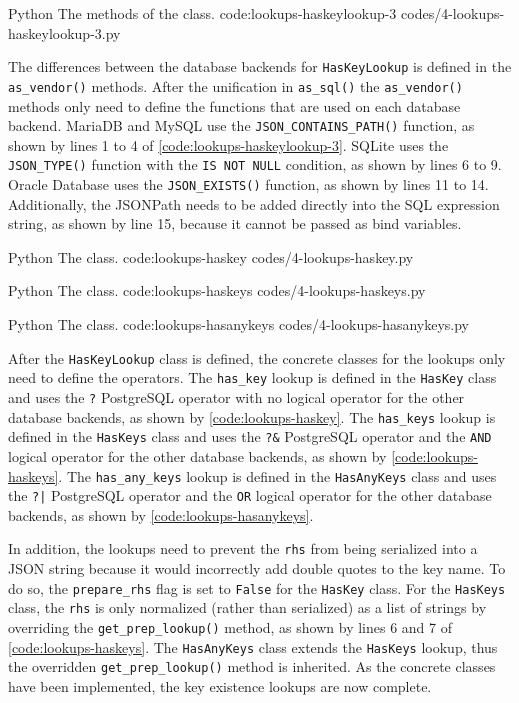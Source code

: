 \listing
{Python}
{The  methods of the  class.}
{code:lookups-haskeylookup-3}
{codes/4-lookups-haskeylookup-3.py}

The differences between the database backends for \verb|HasKeyLookup| is
defined in the \verb|as_vendor()| methods. After the unification in
\verb|as_sql()| the \verb|as_vendor()| methods only need to define the
functions that are used on each database backend. MariaDB and MySQL use the
\verb|JSON_CONTAINS_PATH()| function, as shown by lines 1 to 4 of
\autoref{code:lookups-haskeylookup-3}. SQLite uses the \verb|JSON_TYPE()|
function with the \verb|IS NOT NULL| condition, as shown by lines 6 to 9.
Oracle Database uses the \verb|JSON_EXISTS()| function, as shown by lines 11 to
14. Additionally, the JSONPath needs to be added directly into the SQL
expression string, as shown by line 15, because it cannot be passed as bind
variables.

\listing
{Python}
{The  class.}
{code:lookups-haskey}
{codes/4-lookups-haskey.py}

\listing
{Python}
{The  class.}
{code:lookups-haskeys}
{codes/4-lookups-haskeys.py}

\listing
{Python}
{The  class.}
{code:lookups-hasanykeys}
{codes/4-lookups-hasanykeys.py}

After the \verb|HasKeyLookup| class is defined, the concrete classes for the
lookups only need to define the operators. The \verb|has_key| lookup is defined
in the \verb|HasKey| class and uses the \verb|?| PostgreSQL operator with no
logical operator for the other database backends, as shown by
\autoref{code:lookups-haskey}. The \verb|has_keys| lookup is defined in the
\verb|HasKeys| class and uses the \verb|?&| PostgreSQL operator and the
\verb|AND| logical operator for the other database backends, as shown by
\autoref{code:lookups-haskeys}. The \verb|has_any_keys| lookup is defined in
the \verb|HasAnyKeys| class and uses the \verb=?|= PostgreSQL operator and the
\verb|OR| logical operator for the other database backends, as shown by
\autoref{code:lookups-hasanykeys}.

In addition, the lookups need to prevent the \verb|rhs| from being serialized
into a JSON string because it would incorrectly add double quotes to the key
name. To do so, the \verb|prepare_rhs| flag is set to \verb|False| for the
\verb|HasKey| class. For the \verb|HasKeys| class, the \verb|rhs| is only
normalized (rather than serialized) as a list of strings by overriding the
\verb|get_prep_lookup()| method, as shown by lines 6 and 7 of
\autoref{code:lookups-haskeys}. The \verb|HasAnyKeys| class extends the
\verb|HasKeys| lookup, thus the overridden \verb|get_prep_lookup()| method is
inherited. As the concrete classes have been implemented, the key existence
lookups are now complete.

